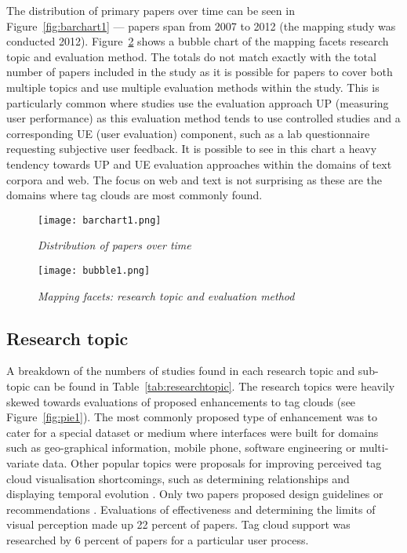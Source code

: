 
The distribution of primary papers over time can be seen in Figure~\vref{fig:barchart1} --- papers span from 2007 to 2012 (the mapping study was conducted 2012). Figure~\ref{fig:bubble1} shows a bubble chart of the mapping facets research topic and evaluation method. The totals do not match exactly with the total number of papers included in the study as it is possible for papers to cover both multiple topics and use multiple evaluation methods within the study. This is particularly common where studies use the evaluation approach UP (measuring user performance) as this evaluation method tends to use controlled studies and a corresponding UE (user evaluation) component, such as a lab questionnaire requesting subjective user feedback. It is possible to see in this chart a heavy tendency towards UP and UE evaluation approaches within the domains of text corpora and web. The focus on web and text is not surprising as these are the domains where tag clouds are most commonly found.

\begin{figure}[!htb]
\centering
\texttt{[image: barchart1.png]}
\caption{\textit{Distribution of papers over time}}
\label{fig:barchart1}
\end{figure}

\begin{figure}[!htb]
\centering
\texttt{[image: bubble1.png]}
\caption{\textit{Mapping facets: research topic and evaluation method}}
\label{fig:bubble1}
\end{figure}

\subsection{Research topic}\label{topic}

A breakdown of the numbers of studies found in each research topic and sub-topic can be found in Table~\vref{tab:researchtopic}. The research topics were heavily skewed towards evaluations of proposed enhancements to tag clouds (see Figure~\vref{fig:pie1}). The most commonly proposed type of enhancement was to cater for a special dataset or medium \citep[such as][]{aras09, kim09, kurtz11, shrinivasan09} where interfaces were built for domains such as geo-graphical information, mobile phone, software engineering or multi-variate data. Other popular topics were proposals for improving perceived tag cloud visualisation shortcomings, such as determining relationships and displaying temporal evolution \citep[for example][]{DiCaro2011120, gomez11}. Only two papers proposed design guidelines or recommendations \citep{rivadeneira07, bateman08}. Evaluations of effectiveness and determining the limits of visual perception made up 22 percent of papers. Tag cloud support was researched by 6 percent of papers for a particular user process.


